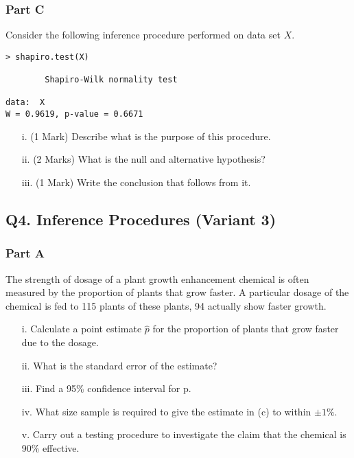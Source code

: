 \documentclass[a4paper,12pt]{article}
\begin{document}
\subsubsection*{Part C} %
Consider the following inference procedure performed on data set $X$.
\begin{center}
\begin{verbatim}
> shapiro.test(X)

        Shapiro-Wilk normality test

data:  X
W = 0.9619, p-value = 0.6671

\end{verbatim}
\end{center}


\begin{itemize}
\item[i.] (1 Mark) Describe what is the purpose of this procedure.
\item[ii.] (2 Marks) What is the null and alternative hypothesis?
\item[iii.] (1 Mark) Write the conclusion that follows from it.
\end{itemize}




\newpage
\subsection*{Q4. Inference Procedures (Variant 3)}
\subsubsection*{Part A} %
The strength of dosage of a plant growth enhancement chemical is often measured by the proportion of plants that grow faster. A particular dosage of the chemical is fed to 115 plants of these plants, 94 actually show faster growth.

 \begin{itemize}
\item[i.] Calculate a point estimate $\hat{p}$ for the proportion of plants that grow faster due to the dosage. 									 
\item[ii.]  What is the standard error of the estimate? 			
\item[iii.] Find a 95\% confidence interval for p. 					
\item[iv.] What size sample is required to give the estimate in (c) to within $\pm1\%$. 	
\item[v.] Carry out a testing procedure to investigate the claim that the chemical is 90\%   effective. 								 \end{itemize}
\end{document}
